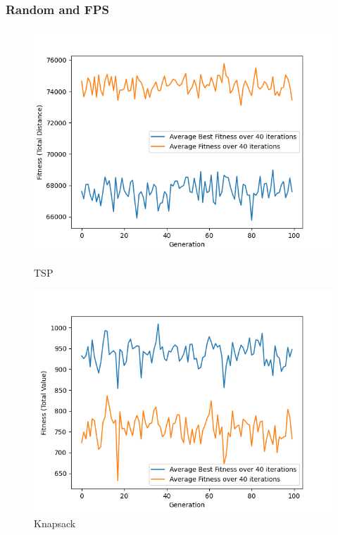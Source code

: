 \documentclass[11pt, letterpaper]{article}
\begin{document}
\subsubsection {Random and FPS}
\begin{figure}[H]
  \includegraphics[width=\linewidth]{images/tsp_rd_fp.png}
  \caption{TSP}
\endminipage\hfill
{}
  \includegraphics[width=\linewidth]{images/knapsack_rd_fp.png}
  \caption{Knapsack}
\endminipage\hfill
{}%

\end{figure}
\end{document}
